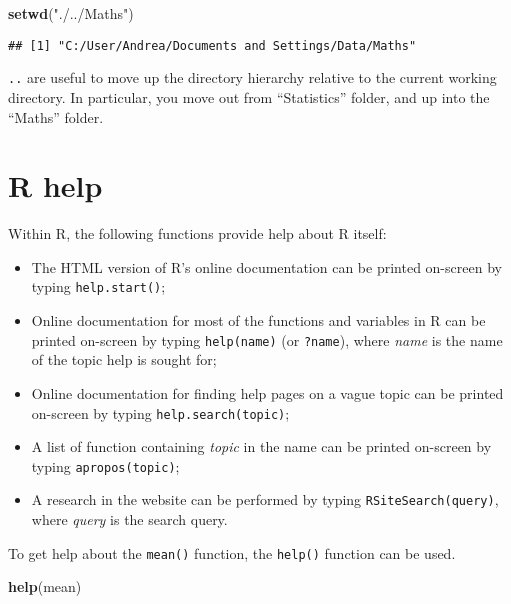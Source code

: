 \documentclass[]{book}
\newenvironment{Shaded}{\begin{snugshade}}{\end{snugshade}}
\newcommand{\KeywordTok}[1]{\textcolor[rgb]{0.13,0.29,0.53}{\textbf{{#1}}}}
\newcommand{\StringTok}[1]{\textcolor[rgb]{0.31,0.60,0.02}{{#1}}}
\newcommand{\NormalTok}[1]{{#1}}
\providecommand{\tightlist}{%
  \setlength{\itemsep}{0pt}\setlength{\parskip}{0pt}}
\def\tightlist{}
\begin{document}
\begin{Shaded}
\begin{Highlighting}[]
\KeywordTok{setwd}\NormalTok{(}\StringTok{"./../Maths"}\NormalTok{)}
\end{Highlighting}
\end{Shaded}

\begin{verbatim}
## [1] "C:/User/Andrea/Documents and Settings/Data/Maths"
\end{verbatim}

\texttt{..} are useful to move up the directory hierarchy relative to
the current working directory. In particular, you move out from
``Statistics'' folder, and up into the ``Maths'' folder.

\section{R help}\label{r-help}

Within R, the following functions provide help about R itself:

\begin{itemize}
\tightlist
\item
  The HTML version of R's online documentation can be printed on-screen
  by typing \texttt{help.start()};
\item
  Online documentation for most of the functions and variables in R can
  be printed on-screen by typing \texttt{help(name)} (or
  \texttt{?name}), where \emph{name} is the name of the topic help is
  sought for;
\item
  Online documentation for finding help pages on a vague topic can be
  printed on-screen by typing
  \texttt{help.search(\textquotesingle{}topic\textquotesingle{})};
\item
  A list of function containing \emph{topic} in the name can be printed
  on-screen by typing
  \texttt{apropos(\textquotesingle{}topic\textquotesingle{})};
\item
  A research in the website can be performed by typing
  \texttt{RSiteSearch(\textquotesingle{}query\textquotesingle{})}, where
  \emph{query} is the search query.
\end{itemize}

To get help about the \texttt{mean()} function, the \texttt{help()}
function can be used.

\begin{Shaded}
\begin{Highlighting}[]
\KeywordTok{help}\NormalTok{(mean)}
\end{Highlighting}
\end{Shaded}
\end{document}
